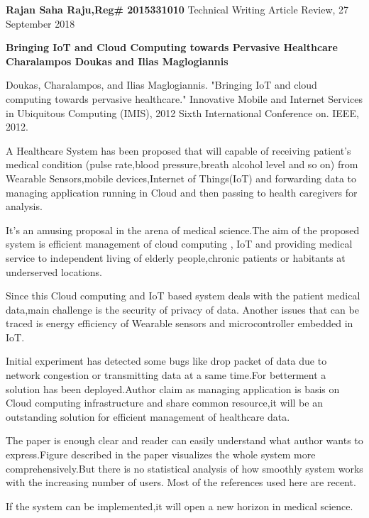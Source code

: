 \documentclass[a4paper,12pt]{article}
\begin{document}
\noindent
\textbf{Rajan Saha Raju,Reg\# 2015331010} \newline
Technical Writing \newline
Article Review, 27 September 2018 \newline \\

\begin{flushright}
\textbf{Bringing IoT and Cloud Computing towards Pervasive Healthcare} \newline 
\textbf{Charalampos Doukas and Ilias Maglogiannis}
\end{flushright}

\begin{flushleft}
\justify
Doukas, Charalampos, and Ilias Maglogiannis. "Bringing IoT and cloud computing towards pervasive healthcare." Innovative Mobile and Internet Services in Ubiquitous Computing (IMIS), 2012 Sixth International Conference on. IEEE, 2012.\newline \\
\end{flushleft}

\justify
\hspace{1cm}A Healthcare System has been proposed that will capable of receiving patient’s medical condition (pulse rate,blood pressure,breath alcohol level and so on) from Wearable Sensors,mobile devices,Internet of Things(IoT) and forwarding data to managing application running in Cloud and then passing to health caregivers for analysis.

\justify
\hspace{1cm}It’s an amusing proposal in the arena of medical science.The aim of the proposed system is efficient management of cloud computing , IoT and providing medical service to independent living of elderly people,chronic patients or habitants at underserved locations.

\justify
\hspace{1cm}Since this Cloud computing and IoT based system deals with the patient medical data,main challenge is the security of privacy of data. Another issues that can be traced is energy efficiency of Wearable sensors and microcontroller embedded in IoT.

\justify
\hspace{1cm}Initial experiment has detected some bugs like drop packet of data due to network congestion or transmitting data at a same time.For betterment a solution has been deployed.Author claim as managing application is basis on Cloud computing infrastructure and share common resource,it will be an outstanding solution for efficient management of healthcare data.

\justify
\hspace{1cm}The paper is enough clear and reader can easily understand what author wants to express.Figure described in the paper visualizes the whole system more comprehensively.But there is no statistical analysis of how smoothly system works with the increasing number of users. Most of the references used here are recent.

\newpage


\justify
\hspace{1cm}If the system can be implemented,it will open a new horizon in medical science.
\end{document}

